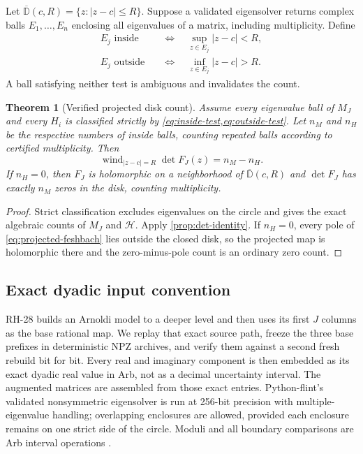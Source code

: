 \documentclass[11pt]{article}
\newtheorem{theorem}{Theorem}[section]
\theoremstyle{definition}
\theoremstyle{remark}
\newcommand{\D}{\mathbb D}
\newcommand{\wind}{\operatorname{wind}}
\begin{document}
Let $\overline{\D}(c,R)=\{z:|z-c|\leq R\}$.  Suppose a validated
eigensolver returns complex balls $E_1,\ldots,E_n$ enclosing all eigenvalues
of a matrix, including multiplicity.  Define
\begin{align}
 E_j\text{ inside} &\quad\Longleftrightarrow\quad
   \sup_{z\in E_j}|z-c|<R,\label{eq:inside-test}\\
 E_j\text{ outside} &\quad\Longleftrightarrow\quad
   \inf_{z\in E_j}|z-c|>R.\label{eq:outside-test}
\end{align}
A ball satisfying neither test is ambiguous and invalidates the count.

\begin{theorem}[Verified projected disk count]
\label{thm:verified-disk-count}
Assume every eigenvalue ball of $M_J$ and every $H_i$ is classified
strictly by \cref{eq:inside-test,eq:outside-test}.  Let $n_M$ and $n_H$ be
the respective numbers of inside balls, counting repeated balls according
to certified multiplicity.  Then
\begin{equation}
 \wind_{|z-c|=R}\det F_J(z)=n_M-n_H.
 \label{eq:verified-winding}
\end{equation}
If $n_H=0$, then $F_J$ is holomorphic on a neighborhood of
$\overline{\D}(c,R)$ and $\det F_J$ has exactly $n_M$ zeros in the disk,
counting multiplicity.
\end{theorem}

\begin{proof}
Strict classification excludes eigenvalues on the circle and gives the
exact algebraic counts of $M_J$ and $\mathcal H$.  Apply
\cref{prop:det-identity}.  If $n_H=0$, every pole of
\cref{eq:projected-feshbach} lies outside the closed disk, so the projected
map is holomorphic there and the zero-minus-pole count is an ordinary zero
count.
\end{proof}

\subsection{Exact dyadic input convention}

RH-28 builds an Arnoldi model to a deeper level and then uses its first
$J$ columns as the base rational map.  We replay that exact source path,
freeze the three base prefixes in deterministic NPZ archives, and verify
them against a second fresh rebuild bit for bit.  Every real and imaginary
component is then embedded as its exact dyadic real value in Arb, not as a
decimal uncertainty interval.  The augmented matrices are assembled from
those exact entries.  Python-flint's validated nonsymmetric
eigensolver is run at 256-bit precision with multiple-eigenvalue handling;
overlapping enclosures are allowed, provided each enclosure remains on one
strict side of the circle.  Moduli and all boundary comparisons are Arb
interval operations \citep{Johansson2017,Rump2010}.
\end{document}
